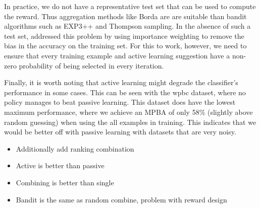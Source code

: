 \documentclass[fleqn,10pt,lineno]{wlpeerj} %
\begin{document}
In practice, we do not have a representative test set that can be used to
compute the reward. Thus aggregation methods like Borda are are suitable than
bandit algorithms such as EXP3++ and Thompson sampling. In the absence of such
a test set, \cite{hsu15} addressed this problem by using importance weighting
to remove the bias in the accuracy on the training set. For this to work,
however, we need to ensure that every training example and active learning
suggestion have a non-zero probability of being selected in every iteration.

Finally, it is worth noting that active learning might degrade the classifier's
performance in some cases. This can be seen with the wpbc dataset, where no
policy manages to beat passive learning. This dataset does have the lowest
maximum performance, where we achieve an MPBA of only 58\% (slightly above
random guessing) when using the all examples in training. This indicates that
we would be better off with passive learning with datasets that are very noisy.

\begin{itemize}
	\item Additionally add ranking combination
	\item Active is better than passive
	\item Combining is better than single
	\item Bandit is the same as random combine, problem with reward design
\end{itemize}
\end{document}
